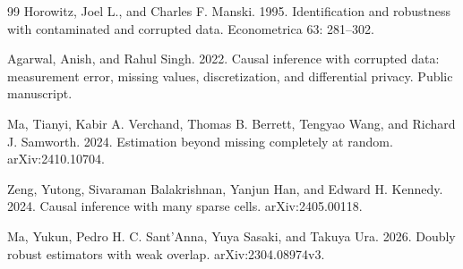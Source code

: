 \documentclass{article}
\begin{document}
\begin{thebibliography}{99}
   Horowitz, Joel L., and Charles F. Manski. 1995. Identification and robustness with contaminated and corrupted data. Econometrica 63: 281--302.

   Agarwal, Anish, and Rahul Singh. 2022. Causal inference with corrupted data: measurement error, missing values, discretization, and differential privacy. Public manuscript.

   Ma, Tianyi, Kabir A. Verchand, Thomas B. Berrett, Tengyao Wang, and Richard J. Samworth. 2024. Estimation beyond missing completely at random. arXiv:2410.10704.

   Zeng, Yutong, Sivaraman Balakrishnan, Yanjun Han, and Edward H. Kennedy. 2024. Causal inference with many sparse cells. arXiv:2405.00118.

   Ma, Yukun, Pedro H. C. Sant’Anna, Yuya Sasaki, and Takuya Ura. 2026. Doubly robust estimators with weak overlap. arXiv:2304.08974v3.

\end{thebibliography}
\end{document}
